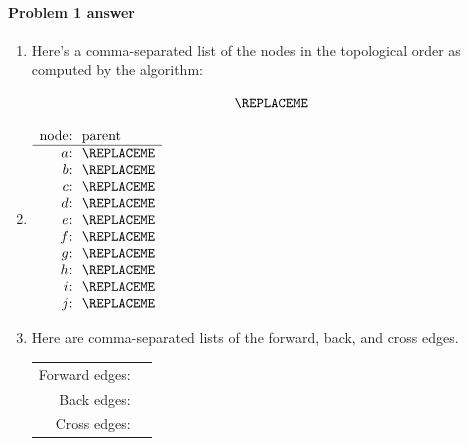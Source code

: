 \paragraph{Problem 1 answer}

\begin{enumerate}[label=(\alph*)]

\item[(a)]  Here's a comma-separated list of the nodes in the topological order as computed by the algorithm:

  \begin{blue}
    \[
      \REPLACEME
    \]
  \end{blue}

\item[(b)]

  \begin{blue}
  \(
    \begin{array}{r@{:~~}l}
      \text{node} & \text{parent} \\ \hline

      a & \REPLACEME \\

      b & \REPLACEME \\

      c & \REPLACEME \\

      d & \REPLACEME \\

      e & \REPLACEME \\

      f & \REPLACEME \\

      g & \REPLACEME \\

      h & \REPLACEME \\

      i & \REPLACEME \\

      j & \REPLACEME
    \end{array}
  \)
\end{blue}
  
\item[(c)]  Here are comma-separated lists of the forward, back, and cross edges. \smallskip

  \begin{tabular}{rl}

    Forward edges:
    & \BLUE{\(
      \REPLACEME
      \)}

    \\

    Back  edges:
    & \BLUE{\(
      \REPLACEME
      \)}

    \\

    Cross edges:
    & \BLUE{\(
      \REPLACEME 
      \)}
  \end{tabular}
  
\end{enumerate}

